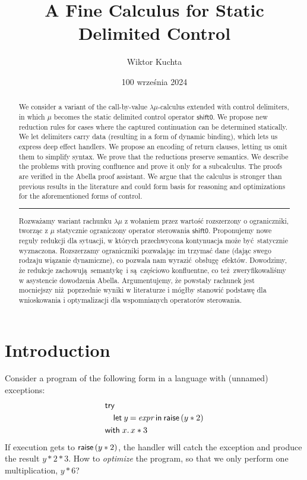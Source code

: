 \documentclass[a4paper, 11pt,titlepage, openright, twoside]{report}
\title{\textbf{A Fine Calculus for Static Delimited Control}}
\author{Wiktor Kuchta}
\date{100 września 2024} %
\newcommand{\shiftz}{\textsf{shift0}}
\newcommand{\keyword}[1]{\textsf{\textup{#1}}}
\newcommand{\KwWith}{\keyword{with}}
\newcommand{\KwRaise}{\keyword{raise}}
\newcommand{\Raise}{\KwRaise\,}
\newcommand{\KwTry}{\keyword{try}}
\newcommand{\Try}{\KwTry\;}
\newcommand{\Let}[3]{\keyword{let}\:#1\:\keyword{=}\:#2\:\keyword{in}\:#3}
\newcommand{\+}{\enspace}
\begin{document}
\maketitle


\thispagestyle{empty}
\cleardoublepage
\begin{abstract}
	We consider a variant of the call-by-value $λμ$-calculus extended with control delimiters,
	in which $μ$ becomes the static delimited control operator $\shiftz$.
	We propose new reduction rules for cases where the captured continuation can be determined statically.
	We let delimiters carry data (resulting in a form of dynamic binding), which lets us express deep effect handlers.
	We propose an encoding of return clauses,
	letting us omit them to simplify syntax.
	We prove that the reductions preserve semantics.
	We describe the problems with proving confluence and prove it only for a subcalculus.
	The proofs are verified in the Abella proof assistant.
	We argue that the calculus is stronger than previous results in the literature and could form basis for
	reasoning and optimizations for the aforementioned forms of control.
%
	\begin{center} \rule[3pt]{300pt}{1pt} \end{center}
%
	Rozważamy wariant rachunku $λμ$ z wołaniem przez wartość rozszerzony
	o ograniczniki,
	tworząc z $μ$ statycznie ograniczony operator sterowania $\shiftz$.
	Proponujemy nowe reguły redukcji dla sytuacji,
	w których przechwycona kontynuacja może być statycznie wyznaczona.
	Rozszerzamy ograniczniki pozwalając im trzymać dane
	(dając swego rodzaju wiązanie dynamiczne),
	co pozwala nam wyrazić obsługę efektów.
	Dowodzimy, że redukcje zachowują semantykę i są częściowo konfluentne,
	co też zweryfikowaliśmy w asystencie dowodzenia Abella.
	Argumentujemy, że powstały rachunek jest mocniejszy niż poprzednie wyniki w literaturze
	i mógłby stanowić podstawę dla wnioskowania i optymalizacji dla wspomnianych operatorów sterowania.

\end{abstract}


\thispagestyle{empty}
\cleardoublepage
\setcounter{page}{5}
\tableofcontents


\chapter{Introduction}
Consider a program of the following form in a language with (unnamed) exceptions:
\begin{align*}
	&\Try \\
	&\quad \Let{y}{\textit{expr}}{\Raise (y*2)} \\
	&\KwWith\; x.\,x*3
\end{align*}
If execution gets to $\Raise (y*2)$, the handler will catch the exception and produce the result $y*2*3$.
How to \textit{optimize} the program, so that we only perform one multiplication, $y*6$?
\end{document}

